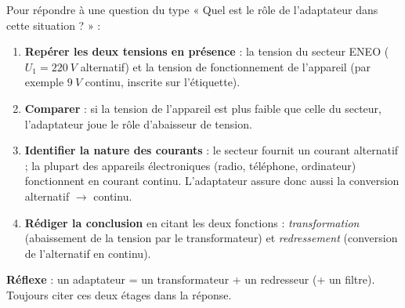 \documentclass[11pt]{article}
\newcommand{\cle}[1]{{\popxbold\color{popdark}#1}}
\begin{document}
\begin{methode}
Pour répondre à une question du type « Quel est le rôle de l'adaptateur dans cette situation ? » :
\begin{enumerate}
\item \textbf{Repérer les deux tensions en présence} : la tension du secteur ENEO ($U_1 = \SI{220}{V}$ alternatif) et la tension de fonctionnement de l'appareil (par exemple $\SI{9}{V}$ continu, inscrite sur l'étiquette).
\item \textbf{Comparer} : si la tension de l'appareil est plus faible que celle du secteur, l'adaptateur joue le rôle d'\cle{abaisseur de tension}.
\item \textbf{Identifier la nature des courants} : le secteur fournit un courant \cle{alternatif} ; la plupart des appareils électroniques (radio, téléphone, ordinateur) fonctionnent en courant \cle{continu}. L'adaptateur assure donc aussi la conversion alternatif $\rightarrow$ continu.
\item \textbf{Rédiger la conclusion} en citant les deux fonctions : \emph{transformation} (abaissement de la tension par le transformateur) et \emph{redressement} (conversion de l'alternatif en continu).
\end{enumerate}
\textbf{Réflexe} : un adaptateur = un \cle{transformateur} + un \cle{redresseur} (+ un filtre). Toujours citer ces deux étages dans la réponse.
\end{methode}
\end{document}
